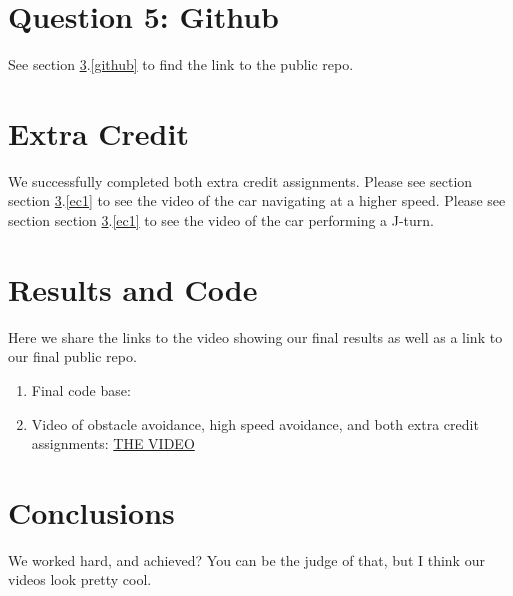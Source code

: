 \documentclass[12pt]{article}
\begin{document}
\maketitle











\section{Question 5: Github}

See section \ref{results}.\ref{github} to find the link to the public repo. 



\section{Extra Credit} 

We successfully completed both extra credit assignments. Please see section section \ref{results}.\ref{ec1} to see the video of the car navigating at a higher speed. Please see section section \ref{results}.\ref{ec1} to see the video of the car performing a J-turn. 

\section{Results and Code}\label{results}
Here we share the links to the video showing our final results as well as a link to our final public repo. 

\begin{enumerate}
	\item\label{github} Final code base: 
	\item\label{ec1} Video of obstacle avoidance, high speed avoidance, and both extra credit assignments: \href{https://drive.google.com/file/d/1DpRamrBsjsI_Y-iftgcQk7L3LIv6SVPm/view?usp=sharing}{THE VIDEO}
\end{enumerate}

\section{Conclusions}\label{conclusions}
We worked hard, and achieved? You can be the judge of that, but I think our videos look pretty cool. 
\end{document}
